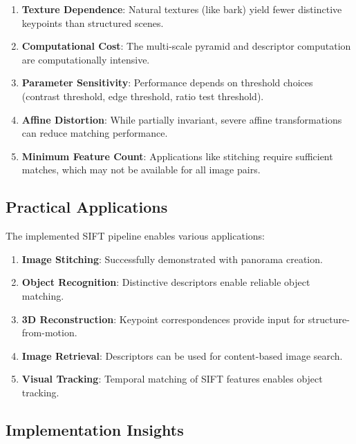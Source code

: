 \documentclass[12pt,a4paper]{article}
\begin{document}
\begin{enumerate}
    \item \textbf{Texture Dependence}: Natural textures (like bark) yield fewer distinctive keypoints than structured scenes.
    
    \item \textbf{Computational Cost}: The multi-scale pyramid and descriptor computation are computationally intensive.
    
    \item \textbf{Parameter Sensitivity}: Performance depends on threshold choices (contrast threshold, edge threshold, ratio test threshold).
    
    \item \textbf{Affine Distortion}: While partially invariant, severe affine transformations can reduce matching performance.
    
    \item \textbf{Minimum Feature Count}: Applications like stitching require sufficient matches, which may not be available for all image pairs.
\end{enumerate}

\subsection{Practical Applications}

The implemented SIFT pipeline enables various applications:

\begin{enumerate}
    \item \textbf{Image Stitching}: Successfully demonstrated with panorama creation.
    
    \item \textbf{Object Recognition}: Distinctive descriptors enable reliable object matching.
    
    \item \textbf{3D Reconstruction}: Keypoint correspondences provide input for structure-from-motion.
    
    \item \textbf{Image Retrieval}: Descriptors can be used for content-based image search.
    
    \item \textbf{Visual Tracking}: Temporal matching of SIFT features enables object tracking.
\end{enumerate}

\subsection{Implementation Insights}
\end{document}
